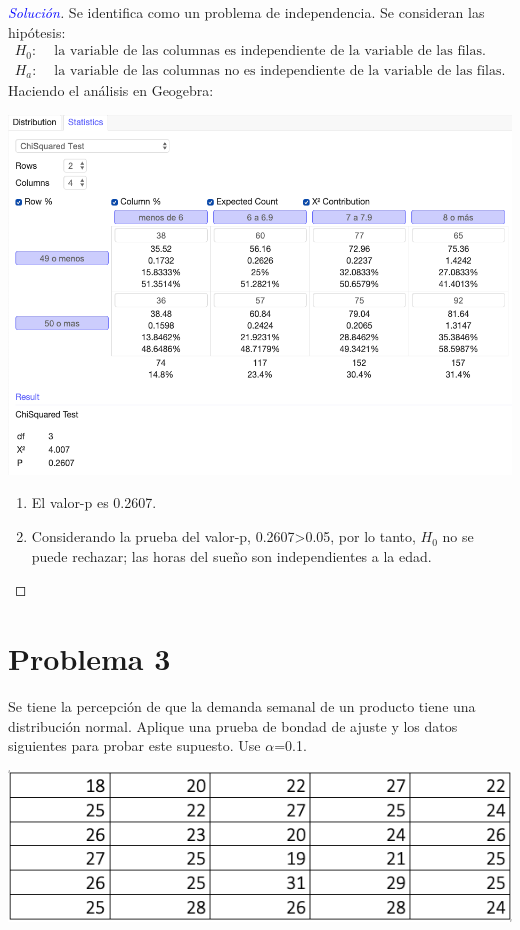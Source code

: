 \documentclass[a4paper,12pt]{article}
\newenvironment{solution}
  {\renewcommand\qedsymbol{$\square$}\begin{proof}[\textcolor{blue}{Solución}]}
  {\end{proof}}
\begin{document}
\begin{solution}
Se identifica como un problema de independencia. Se consideran las hipótesis: 
\begin{align*}
    H_0: & \text{ la variable de las columnas es independiente de la variable de las filas.}\\ 
    H_a: & \text{  la variable de las columnas no es independiente de la variable de las filas.}
\end{align*}
Haciendo el análisis en Geogebra: 
\begin{center}
    \includegraphics[scale=0.45]{images/Screen Shot 2021-05-11 at 16.07.07.png}
\end{center}
\begin{enumerate}
    \item El valor-p es 0.2607.
    \item Considerando la prueba del valor-p, 0.2607>0.05, por lo tanto, $H_0$ no se puede rechazar; las horas del sueño son independientes a la edad.
\end{enumerate}
\end{solution}

\section{Problema 3}
Se tiene la percepción de que la demanda semanal de un producto tiene una distribución normal. Aplique una prueba de bondad de ajuste y los datos siguientes para probar este supuesto. Use $\alpha$=0.1. 
\begin{center}
    \includegraphics[scale=0.45]{images/Screen Shot 2021-05-11 at 16.16.56.png}
\end{center}
\end{document}
